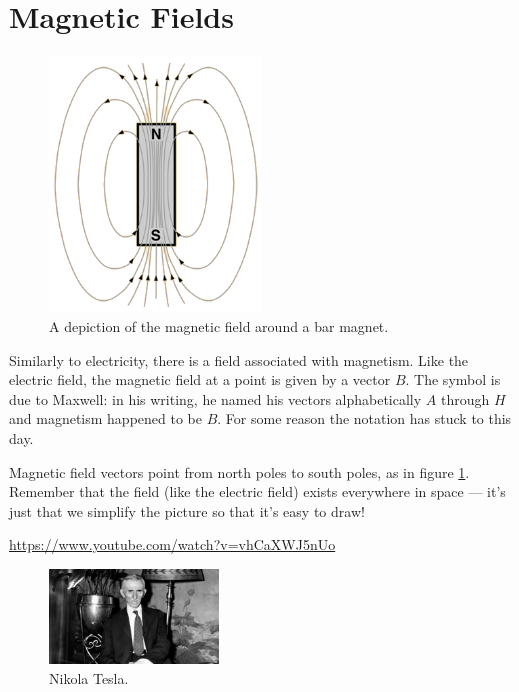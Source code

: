 \documentclass[a4paper]{amsbook}
\newcommand\capcite[1]{}
\begin{document}
\section{Magnetic Fields}
\begin{figure}
  \centering
  \includegraphics[width=0.5\textwidth]{magfield}
  \caption{A depiction of the magnetic field around a bar magnet. \capcite{http://hyperphysics.phy-astr.gsu.edu/hbase/magnetic/imgmag/bar.gif}\label{fig:magfield}}
\end{figure}
Similarly to electricity, there is a field associated with magnetism. Like the electric field, the magnetic field at a point
is given by a vector $ B $. The symbol is due to Maxwell: in his writing, he named his vectors alphabetically $ A $
through $ H $ and magnetism happened to be $ B $. For some reason the notation has stuck to this day.

Magnetic field vectors point from north poles to south poles, as in figure \ref{fig:magfield}. Remember that the field
(like the electric field) exists everywhere in space --- it's just that we simplify the picture so that it's easy to draw!

\begin{center}
\begin{tcolorbox}[width=0.8\textwidth,colback={red},title={\textbf{Go and watch...}},colbacktitle=yellow,coltitle=blue]
  \textcolor{white}{\url{https://www.youtube.com/watch?v=vhCaXWJ5nUo}}
\end{tcolorbox}
\end{center}

\begin{figure}
  \centering
  \includegraphics[width=0.4\textwidth]{tesla}
  \caption{Nikola Tesla. \capcite{http://www.history.com/s3static/video-thumbnails/AETN-History_VMS/812/163/BRAND_THC_BSFC_178895_SFM_000_2997_15_20150113_00_HD.jpg}\label{fig:tesla}}
\end{figure}
\end{document}
